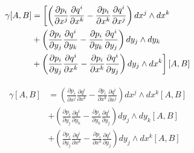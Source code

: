 \documentclass[a4paper,10pt]{article}
\numberwithin{equation}{section}
\newcommand{\zerodel}{.\kern-\nulldelimiterspace}
\begin{document}
\begin{align}
\begin{split}
 \gamma[A,B] &= \left[\left(\frac{\partial p_i}{\partial x^j}\frac{\partial q^i}{\partial x^k} 
 - \frac{\partial p_i}{\partial x^k}\frac{\partial q^i}{\partial x^j}\right)dx^j \wedge dx^k\right\zerodel \\
 &+ \left(\frac{\partial p_i}{\partial y_j}\frac{\partial q^i}{\partial y_k} 
 - \frac{\partial p_i}{\partial y_k}\frac{\partial q^i}{\partial y_j}\right)dy_j \wedge dy_k \\
 &+ \left\zerodel\left(\frac{\partial p_i}{\partial y_j}\frac{\partial q^i}{\partial x^k} 
 - \frac{\partial p_i}{\partial x^k}\frac{\partial q^i}{\partial y_j}\right)dy_j \wedge dx^k\right]
 [A,B]
\end{split}
\end{align}

\begin{align}
\begin{split}
 \gamma[A,B] &= \left(\frac{\partial p_i}{\partial x^j}\frac{\partial q^i}{\partial x^k} 
 - \frac{\partial p_i}{\partial x^k}\frac{\partial q^i}{\partial x^j}\right)dx^j \wedge dx^k[A,B] \\
 &+ \left(\frac{\partial p_i}{\partial y_j}\frac{\partial q^i}{\partial y_k} 
 - \frac{\partial p_i}{\partial y_k}\frac{\partial q^i}{\partial y_j}\right)dy_j \wedge dy_k[A,B] \\
 &+ \left(\frac{\partial p_i}{\partial y_j}\frac{\partial q^i}{\partial x^k} 
 - \frac{\partial p_i}{\partial x^k}\frac{\partial q^i}{\partial y_j}\right)dy_j \wedge dx^k[A,B]
\end{split}
\end{align}
\end{document}
